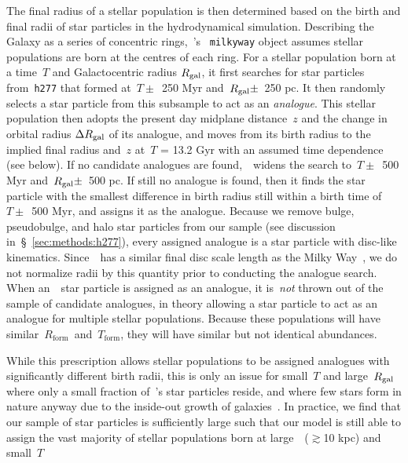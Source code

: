 \documentclass[draft2.tex]{subfiles}
\begin{document}
\par 
The final radius of a stellar population is then determined based on the birth 
and final radii of star particles in the hydrodynamical simulation. 
Describing the Galaxy as a series of concentric rings,~\vice's~
\texttt{milkyway} object assumes stellar populations are born at the centres of 
each ring. 
For a stellar population born at a time~$T$ and Galactocentric radius 
$R_\text{gal}$, it first searches for star particles from~\texttt{h277} that 
formed at~$T \pm$~250 Myr and~$R_\text{gal} \pm$~250 pc. 
It then randomly selects a star particle from this subsample to act as an 
\textit{analogue}. 
This stellar population then adopts the %
present day midplane 
distance~$z$ and the
change in orbital radius 
$\Delta R_\text{gal}$ of its analogue, and moves from its birth radius to the 
implied final radius and~$z$ at~$T$ = 13.2 Gyr with an assumed time dependence 
(see below). 
If no candidate analogues are found,~\vice~widens the search to~$T \pm$~500 Myr 
and~$R_\text{gal} \pm$~500 pc. 
If still no analogue is found, then it finds the star particle with the 
smallest difference in birth radius still within a birth time of $T \pm$~500 
Myr, and assigns it as the analogue. 
Because we remove bulge, pseudobulge, and halo star particles from our sample 
(see discussion in~\S~\ref{sec:methods:h277}), every assigned analogue is a 
star particle with disc-like kinematics. 
Since~\hsim~has a similar final disc scale length as the Milky 
Way~\citep{Bird2021}, we do not normalize radii by this quantity prior to 
conducting the analogue search. 
When an~\hsim~star particle is assigned as an analogue, it is~\textit{not} 
thrown out of the sample of candidate analogues, in theory allowing a star 
particle to act as an analogue for multiple stellar populations. Because these 
populations will have similar~$R_\text{form}$~and~$T_\text{form}$, they will 
have similar but not identical abundances. 
\par 
While this prescription allows stellar populations to be assigned analogues 
with significantly different birth radii, this is only an issue for small~$T$ 
and large~$R_\text{gal}$ where %
only a small fraction of~\hsim's star 
particles reside,
and where few stars form in nature anyway due to the inside-out growth of 
galaxies~\citep[e.g.][]{Bird2013}. 
In practice, we find that our sample of star particles is sufficiently large 
such that our model is still able to assign the vast majority of stellar 
populations born at large~\rgal~($\gtrsim$10 kpc) and small~$T$ 
\end{document}
